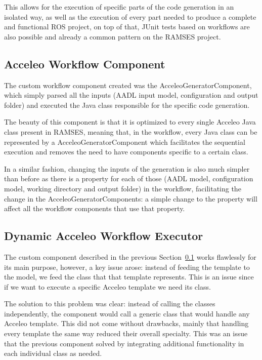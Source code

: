 This allows for the execution of specific parts of the code generation in an isolated way, as well as the execution of every part needed to produce a complete and functional \gls{ROS} project, on top of that, \gls{JUnit} tests based on workflows are also possible and already a common pattern on the \gls{RAMSES} project.

\subsection{Acceleo Workflow Component}
\label{sec:workflows_acceleo}

The custom workflow component created was the AcceleoGeneratorComponent, which simply parsed all the inputs (AADL input model, configuration and output folder) and executed the Java class responsible for the specific code generation.

The beauty of this component is that it is optimized to every single Acceleo Java class present in \gls{RAMSES}, meaning that, in the workflow, every Java class can be represented by a AcceleoGeneratorComponent which facilitates the sequential execution and removes the need to have components specific to a certain class.

In a similar fashion, changing the inputs of the generation is also much simpler than before as there is a property for each of those (\gls{AADL} model, configuration model, working directory and output folder) in the workflow, facilitating the change in the AcceleoGeneratorComponents: a simple change to the property will affect all the workflow components that use that property.


\subsection{Dynamic Acceleo Workflow Executor}
\label{sec:workflows_dynamic_executor}

The custom component described in the previous Section~\ref{sec:workflows_acceleo} works flawlessly for its main purpose, however, a key issue arose: instead of feeding the template to the model, we feed the class that that template represents. This is an issue since if we want to execute a specific Acceleo template we need its class.

The solution to this problem was clear: instead of calling the classes independently, the component would call a generic class that would handle any Acceleo template. This did not come without drawbacks, mainly that handling every template the same way reduced their overall specialty. This was an issue that the previous component solved by integrating additional functionality in each individual class as needed.

